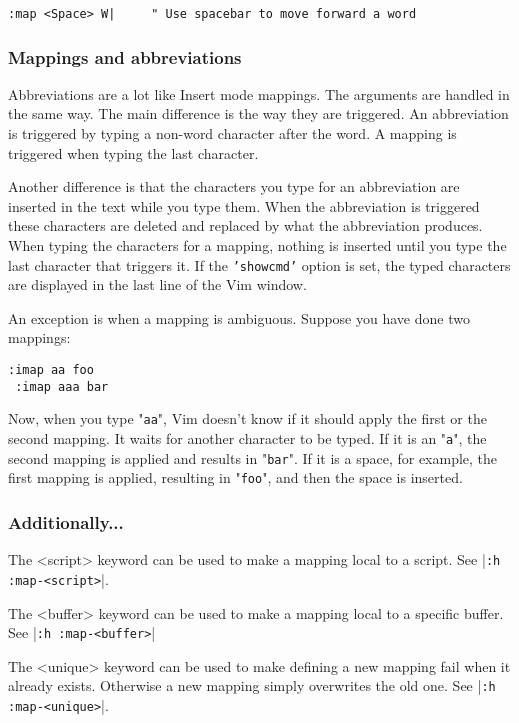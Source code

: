 \begin{Verbatim}[samepage=true]
 :map <Space> W|     " Use spacebar to move forward a word
\end{Verbatim}
\subsubsection{Mappings and abbreviations}
Abbreviations are a lot like Insert mode mappings.
The arguments are handled in the same way.
The main difference is the way they are triggered.
An abbreviation is triggered by typing a non-word character after the word.
A mapping is triggered when typing the last character.

Another difference is that the characters you type for an abbreviation are inserted in the text while you type them.
When the abbreviation is triggered these characters are deleted and replaced by what the abbreviation produces.
When typing the characters for a mapping, nothing is inserted until you type the last character that triggers it.
If the \texttt{'showcmd'} option is set, the typed characters are displayed in the last line of the Vim window.

An exception is when a mapping is ambiguous.
Suppose you have done two mappings:

\begin{Verbatim}[samepage=true]
 :imap aa foo
 :imap aaa bar
\end{Verbatim}

Now, when you type "\texttt{aa}", Vim doesn't know if it should apply the first or the second mapping.
It waits for another character to be typed.
If it is an "\texttt{a}", the second mapping is applied and results in "\texttt{bar}".
If it is a space, for example, the first mapping is applied, resulting in "\texttt{foo}", and then the space is inserted.

\subsubsection{Additionally...}
The <script> keyword can be used to make a mapping local to a script.
See |\texttt{:h :map-<script>}|.

The <buffer> keyword can be used to make a mapping local to a specific buffer.
See |\texttt{:h :map-<buffer>}|

The <unique> keyword can be used to make defining a new mapping fail when it already exists.
Otherwise a new mapping simply overwrites the old one.
See |\texttt{:h :map-<unique>}|.

